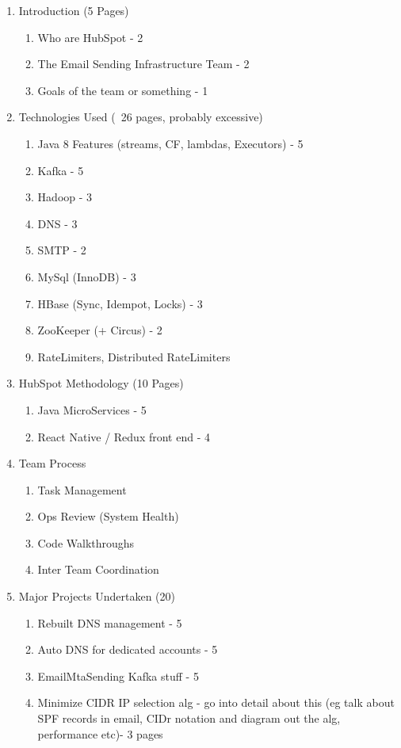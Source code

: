

\begin{enumerate}
	\item Introduction (5 Pages)
	\begin{enumerate}
    	\item Who are HubSpot - 2
        \item The Email Sending Infrastructure Team - 2
        \item Goals of the team or something - 1
    \end{enumerate}
    
    \item Technologies Used (~26 pages, probably excessive)
    \begin{enumerate}
    	\item Java 8 Features (streams, CF, lambdas, Executors) - 5
        \item Kafka - 5
        \item Hadoop - 3
        \item DNS - 3
        \item SMTP - 2
        \item MySql (InnoDB) - 3
        \item HBase (Sync, Idempot, Locks) - 3
        \item ZooKeeper (+ Circus) - 2
        \item RateLimiters, Distributed RateLimiters
    \end{enumerate}
    
    \item HubSpot Methodology (10 Pages)
    \begin{enumerate}
    	\item Java MicroServices - 5
        \item React Native / Redux front end - 4
    \end{enumerate}
    
	\item Team Process
	\begin{enumerate}
		\item Task Management
		\item Ops Review (System Health)
		\item Code Walkthroughs
		\item Inter Team Coordination
	\end{enumerate}	    
    
    \item Major Projects Undertaken (20)
    \begin{enumerate}
    	\item Rebuilt DNS management - 5
        \item Auto DNS for dedicated accounts - 5
    	\item EmailMtaSending Kafka stuff - 5
    	\item Minimize CIDR IP selection alg - go into detail about this (eg talk about SPF records in email, CIDr notation and diagram out the alg, performance etc)- 3 pages
    \end{enumerate}
    
\end{enumerate}
